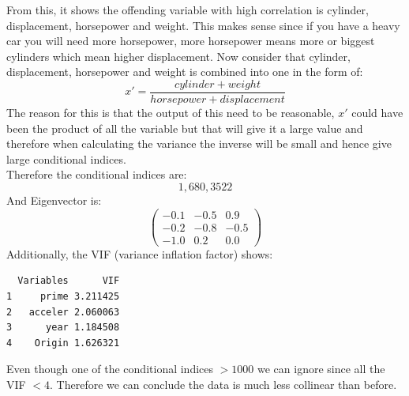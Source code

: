 \documentclass[11pt]{article} %
\begin{document}
From this, it shows the offending variable with high correlation is cylinder, displacement, horsepower and weight. This makes sense since if you have a heavy car you will need more horsepower, more horsepower means more or biggest cylinders which mean higher displacement. Now consider that cylinder, displacement, horsepower and weight is combined into one in the form of:
$$
x'=\frac{cylinder+weight}{horsepower+displacement}
$$
The reason for this is that the output of this need to be reasonable, $x'$ could have been the product of all the variable but that will give it a large value and therefore when calculating the variance the inverse will be small and hence give large conditional indices.\\
Therefore the conditional indices are:
$$
1 ,680,3522
$$
And Eigenvector is:
$$
\begin{pmatrix}
-0.1&-0.5&0.9\\
-0.2&-0.8&-0.5\\
-1.0&0.2&0.0
\end{pmatrix}
$$
Additionally, the VIF (variance inflation factor) shows:
\begin{lstlisting}
  Variables      VIF
1     prime 3.211425
2   acceler 2.060063
3      year 1.184508
4    Origin 1.626321
\end{lstlisting}
Even though one of the conditional indices $>1000$ we can ignore since all the VIF $<4$. Therefore we can conclude the data is much less collinear than before.
\end{document}
